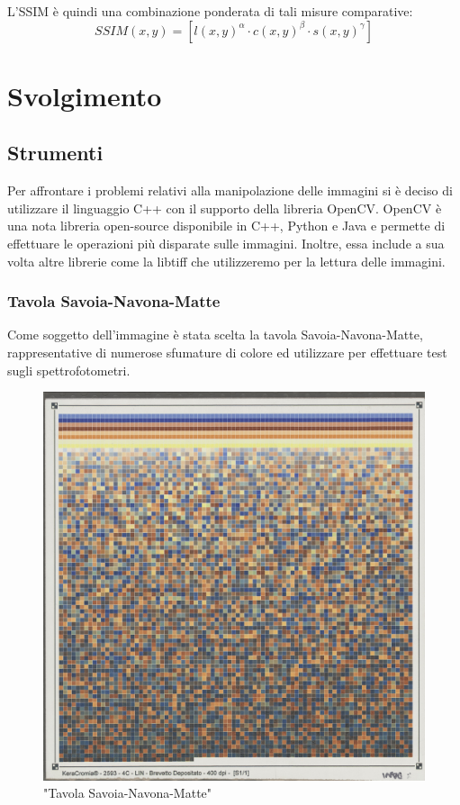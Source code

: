 \documentclass[a4paper,11pt]{article}
\begin{document}
    L'SSIM è quindi una combinazione ponderata di tali misure comparative:
    $$SSIM(x,y) = [l(x,y)^\alpha \cdot c(x,y)^\beta \cdot s(x,y)^\gamma]$$
    
    \newpage

    \section{Svolgimento}

    \subsection{Strumenti}
    Per affrontare i problemi relativi alla manipolazione delle immagini si è deciso di utilizzare il linguaggio C++ con il supporto della libreria OpenCV.
    OpenCV è una nota libreria open-source disponibile in C++, Python e Java e permette di effettuare le operazioni più disparate sulle immagini.
    Inoltre, essa include a sua volta altre librerie come la libtiff che utilizzeremo per la lettura delle immagini.
    
    \subsubsection{Tavola Savoia-Navona-Matte}
    Come soggetto dell'immagine è stata scelta la tavola Savoia-Navona-Matte, rappresentative di numerose sfumature di colore ed utilizzare per effettuare test sugli spettrofotometri.

    \begin{figure}[h]
        \centering
        \includegraphics[scale=0.4]{tavola}
        \caption{"Tavola Savoia-Navona-Matte"}
    \end{figure}
\end{document}
